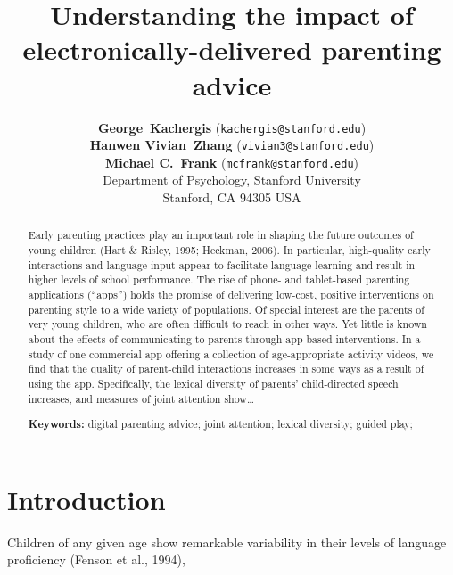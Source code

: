 \documentclass[10pt, letterpaper]{article}
\title{Understanding the impact of electronically-delivered parenting advice}
\author{{\large\bf George~Kachergis} (\texttt{kachergis@stanford.edu}) \\ {\large\bf Hanwen Vivian~Zhang} (\texttt{vivian3@stanford.edu}) \\ {\large\bf Michael C.~Frank} (\texttt{mcfrank@stanford.edu}) \\  Department of Psychology, Stanford University \\  Stanford, CA 94305 USA}
\begin{document}
\maketitle

\begin{abstract}
Early parenting practices play an important role in shaping the future
outcomes of young children (Hart \& Risley, 1995; Heckman, 2006). In
particular, high-quality early interactions and language input appear to
facilitate language learning and result in higher levels of school
performance. The rise of phone- and tablet-based parenting applications
(``apps'') holds the promise of delivering low-cost, positive
interventions on parenting style to a wide variety of populations. Of
special interest are the parents of very young children, who are often
difficult to reach in other ways. Yet little is known about the effects
of communicating to parents through app-based interventions. In a study
of one commercial app offering a collection of age-appropriate activity
videos, we find that the quality of parent-child interactions increases
in some ways as a result of using the app. Specifically, the lexical
diversity of parents' child-directed speech increases, and measures of
joint attention show\ldots{}

\textbf{Keywords:}
digital parenting advice; joint attention; lexical diversity; guided
play;
\end{abstract}

\section{Introduction}\label{introduction}

Children of any given age show remarkable variability in their levels of
language proficiency (Fenson et al., 1994),
\end{document}
